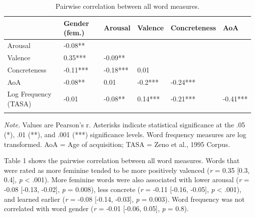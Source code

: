 \documentclass[english,,man,floatsintext]{apa6}
\begin{document}
\begin{table}[tbp]
\begin{center}
\begin{threeparttable}
\caption{\label{tab:unnamed-chunk-14}Pairwise correlation between all word measures.}
\begin{tabular}{llllll}
\toprule
 & Gender (fem.) & Arousal & Valence & Concreteness & AoA\\
\midrule
Arousal & -0.08** &  &  &  & \\
Valence & 0.35*** & -0.09** &  &  & \\
Concreteness & -0.11*** & -0.18*** & 0.01 &  & \\
AoA & -0.08** & 0.01 & -0.2*** & -0.24*** & \\
Log Frequency (TASA) & -0.01 & -0.08** & 0.14*** & -0.21*** & -0.41***\\
\bottomrule
\addlinespace
\end{tabular}
\begin{tablenotes}[para]
\normalsize{\textit{Note.} Values are Pearson's r. Asterisks indicate statistical significance at the .05 (*), .01 (**), and .001 (***) significance levels. Word frequency measures are log transformed. AoA = Age of acquisition; TASA = Zeno et al., 1995 Corpus.}
\end{tablenotes}
\end{threeparttable}
\end{center}
\end{table}

Table 1 shows the pairwise correlation between all word measures. Words that were rated as more feminine tended to be more positively valenced (\emph{r} = 0.35 {[}0.3, 0.4{]}, \emph{p} \textless{} .001). More feminine words were also associated with lower arousal (\emph{r} = -0.08 {[}-0.13, -0.02{]}, \emph{p} = 0.008), less concrete (\emph{r} = -0.11 {[}-0.16, -0.05{]}, \emph{p} \textless{} .001), and learned earlier (\emph{r} = -0.08 {[}-0.14, -0.03{]}, \emph{p} = 0.003). Word frequency was not correlated with word gender (\emph{r} = -0.01 {[}-0.06, 0.05{]}, \emph{p} = 0.8).
\end{document}
